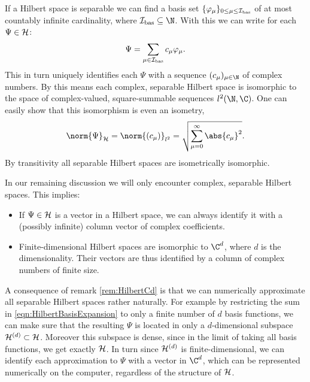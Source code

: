 \begin{rem}
	\label{rem:HilbertCd}
	If a Hilbert space is separable we can find a basis set
	$\{ \varphi_\mu \}_{0 \leq \mu \leq \mathcal{I}_\text{bas}}$
	of at most countably infinite cardinality,
	\ie where $\Ibas \subseteq \N$.
	With this we can write for each $\Psi \in \mathcal{H}$:
	\begin{equation}
		\Psi = \sum_{\mu \in \mathcal{I}_\text{bas}} c_\mu \varphi_\mu.
		\label{eqn:HilbertBasisExpansion}
	\end{equation}
	This in turn uniquely identifies each $\Psi$ with a sequence
	$(c_\mu)_{\mu\in\N}$ of complex numbers.
	By this means each complex, separable Hilbert space is
	isomorphic to the space of complex-valued, square-summable sequences $l^2(\N, \C)$.
	One can easily show that this isomorphism is even an isometry, \ie
	\[ \norm{\Psi}_\hilbert = \norm{(c_\mu)}_{l^2}
		= \sqrt{ \sum_{\mu=0}^\infty \abs{c_\mu}^2 }. \]
	By transitivity all separable Hilbert spaces are isometrically isomorphic.

	In our remaining discussion we will only encounter complex,
	separable Hilbert spaces. This implies:
	\begin{itemize}
		\item If $\Psi \in \mathcal{H}$ is a vector in a Hilbert space,
			we can always identify it with a
			(possibly infinite) column vector of complex coefficients.
		\item Finite-dimensional Hilbert spaces are isomorphic to $\C^d$,
			where $d$ is the dimensionality.
			Their vectors are thus identified by a column of complex numbers
			of finite size.
	\end{itemize}
\end{rem}

\begin{rem}
	\label{rem:HilbertApproximation}
A consequence of remark \vref{rem:HilbertCd} is that we can
numerically approximate all separable Hilbert spaces rather naturally.
For example by restricting the sum in \eqref{eqn:HilbertBasisExpansion}
to only a finite number of $d$ basis functions,
we can make sure that the resulting $\Psi$ is located
in only a $d$-dimensional subspace $\mathcal{H}^{(d)} \subset \mathcal{H}$.
Moreover this subspace is dense, since in the limit of taking
all basis functions, we get exactly $\mathcal{H}$.
In turn since $\mathcal{H}^{(d)}$ is finite-dimensional,
we can identify each approximation to $\Psi$ with a vector in $\C^d$,
which can be represented numerically on the computer,
regardless of the structure of $\mathcal{H}$.
\end{rem}

